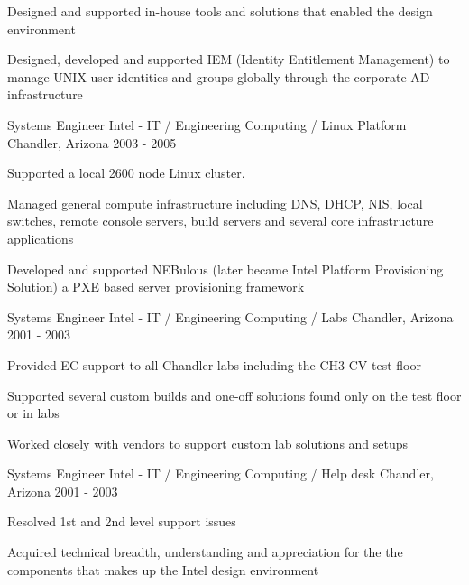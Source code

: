 \begin{cventries}
{\begin{cvitems}
        \item {Designed and supported in-house tools and solutions that enabled the design environment}
        \item {Designed, developed and supported IEM (Identity Entitlement Management) to manage UNIX user identities and groups globally through the corporate AD infrastructure}
      \end{cvitems}
    }
  \cventry
    {Systems Engineer}
    {Intel - IT / Engineering Computing / Linux Platform }
    {Chandler, Arizona}
    {2003 - 2005}
    {
      \begin{cvitems}
        \item {Supported a local 2600 node Linux cluster.}
        \item {Managed general compute infrastructure including DNS, DHCP, NIS, local switches, remote console servers, build servers and several core infrastructure applications}      
        \item {Developed and supported NEBulous (later became Intel Platform Provisioning Solution) a PXE based server provisioning framework}
      \end{cvitems}
    }
  \cventry
    {Systems Engineer}
    {Intel - IT / Engineering Computing / Labs }
    {Chandler, Arizona}
    {2001 - 2003}
    {
      \begin{cvitems}
        \item {Provided EC support to all Chandler labs including the CH3 CV test floor}
        \item {Supported several custom builds and one-off solutions found only on the test floor or in labs}
        \item {Worked closely with vendors to support custom lab solutions and setups}
      \end{cvitems}      
    }
  \cventry
    {Systems Engineer}
    {Intel - IT / Engineering Computing / Help desk}
    {Chandler, Arizona}
    {2001 - 2003}
    {
      \begin{cvitems}
        \item {Resolved 1st and 2nd level support issues}
        \item {Acquired technical breadth, understanding and appreciation for the the components that makes up the Intel design environment}
      \end{cvitems}      
    }            
\end{cventries}
